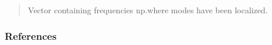 \documentclass[letterpaper,10pt,english]{sphinxmanual}
\begin{document}
\begin{fulllineitems}
\begin{quote}
\begin{description}
\begin{description}
\end{description}

\begin{description}
\sphinxAtStartPar
Vector containing frequencies np.where modes have been localized.

\end{description}

\end{description}\end{quote}
\subsubsection*{References}

\sphinxAtStartPar
{}

\end{fulllineitems}

\end{document}
